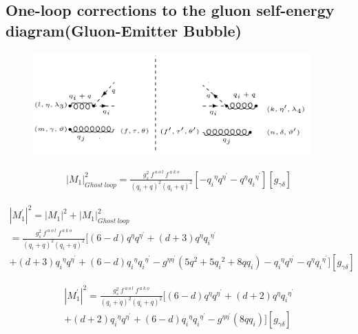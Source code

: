 \pagebreak
\subsection{One-loop corrections to the gluon self-energy diagram(Gluon-Emitter Bubble)}
\begin{figure}[h!]
\centering
\includegraphics[width=0.95\textwidth]{images/GG/Ghost.png}
\end{figure}

\begin{equation}
\begin{split}
{{|M_1|}^2_{Ghost \:loop}}=\frac{g_s^2 \:f^{\:a\:o\:l}\: f^{\:a\:k\:o}}{(q_i +q)^2 (q_i +q)^2} [-{q_i}^{{\eta}}{q}^{{\eta}^{\prime}}-{q}^{{\eta}}{q_i}^{{\eta}^{\prime}}][g_{{\gamma}{\delta}}]
\end{split}
\end{equation}

\begin{equation}
\begin{split}
{|{M}^{\prime}_1|}^2 = {|M_1|}^2+{{|M_1|}^2_{Ghost \:loop}}\\=\frac{g_s^2 \:f^{\:a\:o\:l}\: f^{\:a\:k\:o}}{(q_i +q)^2 (q_i +q)^2}  [(6-d){q}^{{\eta}}{q}^{{\eta}^{\prime}}+(d+3){q}^{{\eta}}{q_i}^{{\eta}^{\prime}}\\+(d+3){q_i}^{{\eta}}{q}^{{\eta}^{\prime}}+(6-d){q_i}^{{\eta}}{q_i}^{{\eta}^{\prime}}-g^{{\eta}{{\eta}^{\prime}}}(5{q}^2+5{q_i}^2+8qq_i)-{q_i}^{{\eta}}{q}^{{\eta}^{\prime}}-{q}^{{\eta}}{q_i}^{{\eta}^{\prime}}][g_{{\gamma}{\delta}}]
\end{split}
\end{equation}

\begin{equation}
\begin{split}
{|{M}^{\prime}_1|}^2 =\frac{g_s^2 \:f^{\:a\:o\:l}\: f^{\:a\:k\:o}}{(q_i +q)^2 (q_i +q)^2}  [(6-d){q}^{{\eta}}{q}^{{\eta}^{\prime}}+(d+2){q}^{{\eta}}{q_i}^{{\eta}^{\prime}}\\+(d+2){q_i}^{{\eta}}{q}^{{\eta}^{\prime}}+(6-d){q_i}^{{\eta}}{q_i}^{{\eta}^{\prime}}-g^{{\eta}{{\eta}^{\prime}}}(8qq_i)][g_{{\gamma}{\delta}}]
\end{split}
\end{equation}

